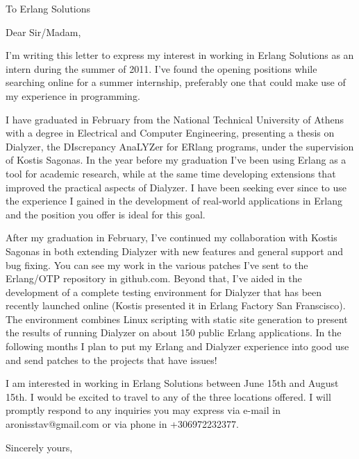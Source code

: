 
\topmargin=-1in    %
\textheight=9in  %
\textwidth=5in   %


\signature{Stavros Aronis}
\address{Mr. Stavros Aronis \\ Karaiskaki 3 \\ 16675, Glyfada, GR}

\begin{letter}{To Erlang Solutions}

\opening{Dear Sir/Madam,}

I'm writing this letter to express my interest in working in Erlang Solutions as
an intern during the summer of 2011. I've found the opening positions while
searching online for a summer internship, preferably one that could make use of
my experience in programming.

I have graduated in February from the National Technical University of Athens
with a degree in Electrical and Computer Engineering, presenting a thesis on
Dialyzer, the DIscrepancy AnaLYZer for ERlang programs, under the supervision of
Kostis Sagonas. In the year before my graduation I've been using Erlang as a
tool for academic research, while at the same time developing extensions that
improved the practical aspects of Dialyzer. I have been seeking ever since to
use the experience I gained in the development of real-world applications in
Erlang and the position you offer is ideal for this goal.

After my graduation in February, I've continued my collaboration with Kostis
Sagonas in both extending Dialyzer with new features and general support and bug
fixing. You can see my work in the various patches I've sent to the Erlang/OTP
repository in github.com. Beyond that, I've aided in the development of a
complete testing environment for Dialyzer that has been recently launched online
(Kostis presented it in Erlang Factory San Franscisco). The environment combines
Linux scripting with static site generation to present the results of running
Dialyzer on about 150 public Erlang applications. In the following months I plan
to put my Erlang and Dialyzer experience into good use and send patches to the
projects that have issues!

I am interested in working in Erlang Solutions between June 15th and August
15th. I would be excited to travel to any of the three locations offered. I will
promptly respond to any inquiries you may express via e-mail in
aronisstav@gmail.com or via phone in +306972232377.

\closing{Sincerely yours,}

\end{letter}

